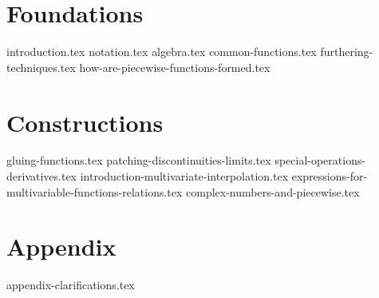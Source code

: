 \documentclass[10pt,a4paper,twoside]{report}
\begin{document}
\maketitle
\tableofcontents
\newpage

\part{Foundations}
{introduction.tex}
{notation.tex}
{algebra.tex}
{common-functions.tex}
{furthering-techniques.tex}
{how-are-piecewise-functions-formed.tex}

\part{Constructions}
{gluing-functions.tex}
{patching-discontinuities-limits.tex}
{special-operations-derivatives.tex}
{introduction-multivariate-interpolation.tex}
{expressions-for-multivariable-functions-relations.tex}
{complex-numbers-and-piecewise.tex}

\part{Appendix}
\appendix
{appendix-clarifications.tex}
\printglossary[title=Glossary, toctitle=Glossary]
\glsaddallunused
\end{document}
